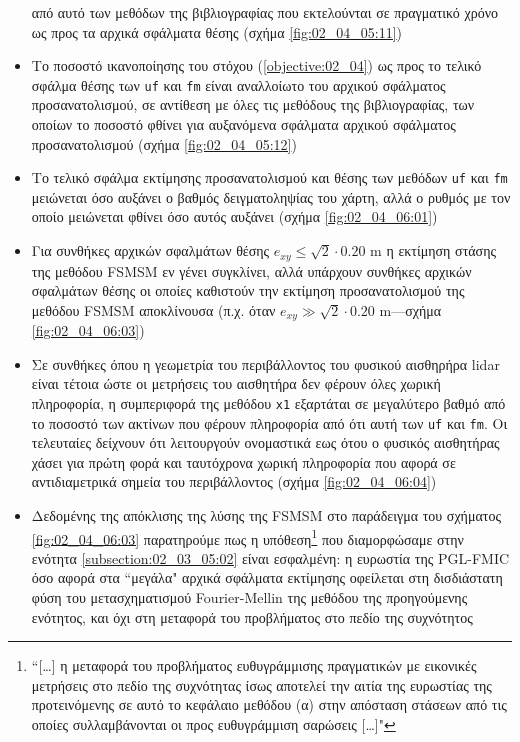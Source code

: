 \begin{itemize}
        από αυτό των μεθόδων της βιβλιογραφίας που εκτελούνται σε πραγματικό
        χρόνο ως προς τα αρχικά σφάλματα θέσης (σχήμα \ref{fig:02_04_05:11})
  \item Το ποσοστό ικανοποίησης του στόχου (\ref{objective:02_04}) ως προς
        το τελικό σφάλμα θέσης των \texttt{uf} και \texttt{fm} είναι αναλλοίωτο
        του αρχικού σφάλματος προσανατολισμού, σε αντίθεση με όλες τις μεθόδους
        της βιβλιογραφίας, των οποίων το ποσοστό φθίνει για αυξανόμενα σφάλματα
        αρχικού σφάλματος προσανατολισμού (σχήμα \ref{fig:02_04_05:12})
  \item Το τελικό σφάλμα εκτίμησης προσανατολισμού και θέσης των μεθόδων
        \texttt{uf} και \texttt{fm} μειώνεται όσο αυξάνει ο βαθμός
        δειγματοληψίας του χάρτη, αλλά ο ρυθμός με τον οποίο μειώνεται φθίνει
        όσο αυτός αυξάνει (σχήμα \ref{fig:02_04_06:01})
  \item Για συνθήκες αρχικών σφαλμάτων θέσης $e_{xy} \leq \sqrt{2}\cdot 0.20$ m
        η εκτίμηση στάσης της μεθόδου FSMSM εν γένει συγκλίνει, αλλά υπάρχουν
        συνθήκες αρχικών σφαλμάτων θέσης οι οποίες καθιστούν την εκτίμηση
        προσανατολισμού της μεθόδου FSMSM αποκλίνουσα (π.χ.  όταν $e_{xy} \gg
        \sqrt{2}\cdot 0.20$ m---σχήμα \ref{fig:02_04_06:03})
  \item Σε συνθήκες όπου η γεωμετρία του περιβάλλοντος του φυσικού αισθηρήρα
        lidar είναι τέτοια ώστε οι μετρήσεις του αισθητήρα δεν φέρουν όλες
        χωρική πληροφορία, η συμπεριφορά της μεθόδου \texttt{x1} εξαρτάται
        σε μεγαλύτερο βαθμό από το ποσοστό των ακτίνων που φέρουν πληροφορία
        από ότι αυτή των \texttt{uf} και \texttt{fm}. Οι τελευταίες δείχνουν
        ότι λειτουργούν ονομαστικά εως ότου ο φυσικός αισθητήρας χάσει για
        πρώτη φορά και ταυτόχρονα χωρική πληροφορία που αφορά σε αντιδιαμετρικά
        σημεία του περιβάλλοντος (σχήμα \ref{fig:02_04_06:04})
  \item Δεδομένης της απόκλισης της λύσης της FSMSM στο παράδειγμα του σχήματος
        \ref{fig:02_04_06:03} παρατηρούμε πως η υπόθεση\footnote{``[\dots] η
        μεταφορά του προβλήματος ευθυγράμμισης πραγματικών με εικονικές
        μετρήσεις στο πεδίο της συχνότητας ίσως αποτελεί την αιτία της
        ευρωστίας της προτεινόμενης σε αυτό το κεφάλαιο μεθόδου (α) στην
        απόσταση στάσεων από τις οποίες συλλαμβάνονται οι προς ευθυγράμμιση
        σαρώσεις [\dots]"} που διαμορφώσαμε στην ενότητα
        \ref{subsection:02_03_05:02} είναι εσφαλμένη: η ευρωστία της PGL-FMIC
        όσο αφορά στα ``μεγάλα" αρχικά σφάλματα εκτίμησης οφείλεται στη
        δισδιάστατη φύση του μετασχηματισμού Fourier-Mellin της μεθόδου της
        προηγούμενης ενότητος, και όχι στη μεταφορά του προβλήματος στο πεδίο
        της συχνότητος
\end{itemize}


